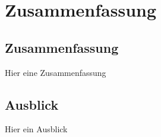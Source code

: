 \chapter{Zusammenfassung}
\label{chap:ausblick}

\section{Zusammenfassung}
Hier eine Zusammenfassung

\section{Ausblick}
Hier ein Ausblick